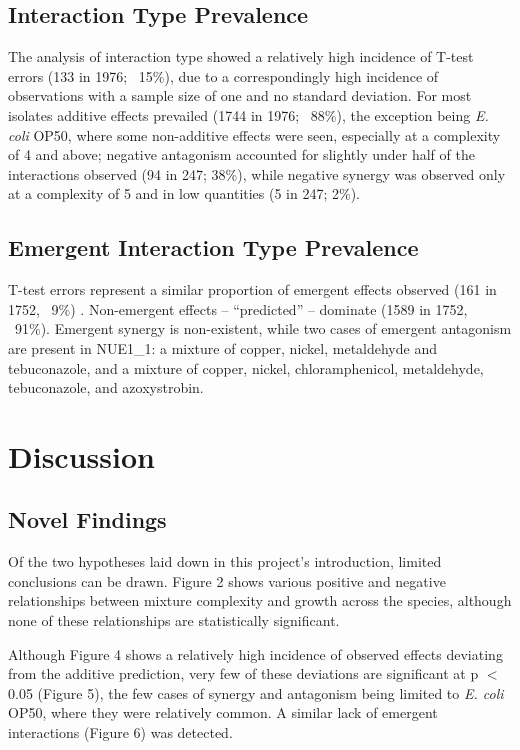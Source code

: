 \documentclass[review,12pt]{elsarticle}
\begin{document}
\subsection{Interaction Type Prevalence}
\label{S:3:5}

The analysis of interaction type showed a relatively high incidence of T-test errors (133 in 1976; ~15\%), due to a correspondingly high incidence of observations with a sample size of one and no standard deviation. For most isolates additive effects prevailed (1744 in 1976; ~88\%), the exception being \textit{E. coli} OP50, where some non-additive effects were seen, especially at a complexity of 4 and above; negative antagonism accounted for slightly under half of the interactions observed (94 in 247; 38\%), while negative synergy was observed only at a complexity of 5 and in low quantities (5 in 247; 2\%).

\subsection{Emergent Interaction Type Prevalence}
\label{S:3:6}

T-test errors represent a similar proportion of emergent effects observed (161 in 1752, ~9\%) . Non-emergent effects – “predicted” – dominate (1589 in 1752, ~91\%). Emergent synergy is non-existent, while two cases of emergent antagonism are present in NUE1\_1: a mixture of copper, nickel, metaldehyde and tebuconazole, and a mixture of copper, nickel, chloramphenicol, metaldehyde, tebuconazole, and azoxystrobin.

\section{Discussion}
\label{S:4}

\subsection{Novel Findings}
\label{S:4:1}

Of the two hypotheses laid down in this project’s introduction, limited conclusions can be drawn. Figure 2 shows various positive and negative relationships between mixture complexity and growth across the species, although none of these relationships are statistically significant. 

Although Figure 4 shows a relatively high incidence of observed effects deviating from the additive prediction, very few of these deviations are significant at p $<$ 0.05 (Figure 5), the few cases of synergy and antagonism being limited to \textit{E. coli} OP50, where they were relatively common. A similar lack of emergent interactions (Figure 6) was detected. 
\end{document}

